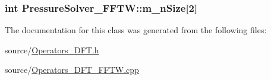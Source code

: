 \subsubsection[{m\+\_\+n\+Size}]{\setlength{\rightskip}{0pt plus 5cm}int Pressure\+Solver\+\_\+\+F\+F\+T\+W\+::m\+\_\+n\+Size\mbox{[}2\mbox{]}\hspace{0.3cm}{\ttfamily [protected]}}\label{class_pressure_solver___f_f_t_w_ab8e6476a6cfeff321785f4cb0220aa08}


The documentation for this class was generated from the following files\+:\begin{DoxyCompactItemize}
\item 
source/\hyperlink{_operators___d_f_t_8h}{Operators\+\_\+\+D\+F\+T.\+h}\item 
source/\hyperlink{_operators___d_f_t___f_f_t_w_8cpp}{Operators\+\_\+\+D\+F\+T\+\_\+\+F\+F\+T\+W.\+cpp}\end{DoxyCompactItemize}
